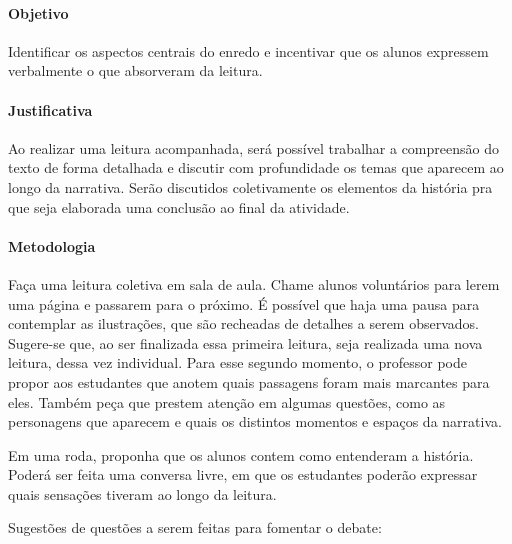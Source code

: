 \documentclass[11pt]{extarticle}
\begin{document}
\paragraph{Objetivo} Identificar os aspectos centrais do enredo e incentivar que os alunos expressem verbalmente o que absorveram da leitura.


\paragraph{Justificativa} Ao realizar uma leitura acompanhada, será possível trabalhar a compreensão do texto de forma detalhada e discutir com profundidade os temas que aparecem ao longo da narrativa. Serão discutidos coletivamente os elementos da história pra que seja elaborada uma conclusão ao final da atividade.

\paragraph{Metodologia} Faça uma leitura coletiva em sala de aula. Chame alunos voluntários para lerem uma página e passarem para o próximo. É possível que haja uma pausa para contemplar as ilustrações, que são recheadas de detalhes a serem observados. Sugere-se que, ao ser finalizada essa primeira leitura, seja realizada uma nova leitura, dessa vez individual. Para esse segundo momento, o professor pode propor aos estudantes que anotem quais passagens foram mais marcantes para eles. Também peça que prestem atenção em algumas questões, como as personagens que aparecem e quais os distintos momentos e espaços da narrativa.


Em uma roda, proponha que os alunos contem como entenderam a história. Poderá ser feita uma conversa livre, em que os estudantes poderão expressar quais sensações tiveram ao longo da leitura. 

Sugestões de questões a serem feitas para fomentar o debate:
\end{document}
